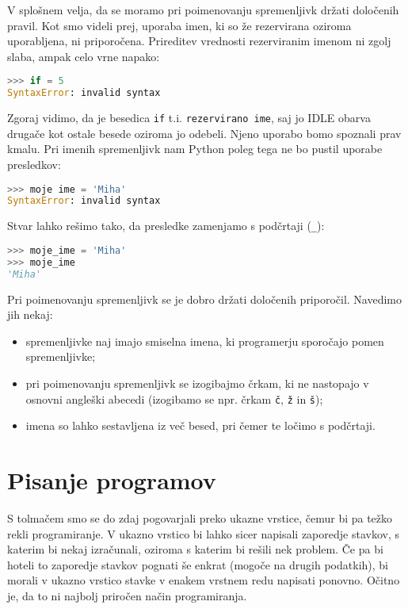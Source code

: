 V splošnem velja, da se moramo pri poimenovanju spremenljivk držati določenih pravil. Kot smo videli prej, uporaba imen, ki so že rezervirana oziroma uporabljena, ni priporočena. Prireditev vrednosti rezerviranim imenom ni zgolj slaba, ampak celo vrne napako:
\begin{lstlisting}[language=Python]
>>> if = 5
SyntaxError: invalid syntax
\end{lstlisting}
Zgoraj vidimo, da je besedica \texttt{if} t.i. \texttt{rezervirano ime}, saj jo IDLE obarva drugače kot ostale besede oziroma jo odebeli. Njeno uporabo bomo spoznali prav kmalu. Pri imenih spremenljivk nam Python poleg tega ne bo pustil uporabe presledkov:
\begin{lstlisting}[language=Python]
>>> moje ime = 'Miha'
SyntaxError: invalid syntax
\end{lstlisting}
Stvar lahko rešimo tako, da presledke zamenjamo s podčrtaji (\texttt{\_}):
\begin{lstlisting}[language=Python]
>>> moje_ime = 'Miha'
>>> moje_ime
'Miha'
\end{lstlisting}
Pri poimenovanju spremenljivk se je dobro držati določenih priporočil. Navedimo jih nekaj:
\begin{itemize}
    \item spremenljivke naj imajo smiselna imena, ki programerju sporočajo pomen spremenljivke;
    \item pri poimenovanju spremenljivk se izogibajmo črkam, ki ne nastopajo v osnovni angleški abecedi (izogibamo se npr. črkam \texttt{č}, \texttt{ž} in \texttt{š});
    \item imena so lahko sestavljena iz več besed, pri čemer te ločimo s podčrtaji.
\end{itemize}

\section{Pisanje programov}

S tolmačem smo se do zdaj pogovarjali preko ukazne vrstice, čemur bi pa težko rekli programiranje. V ukazno vrstico bi lahko sicer napisali zaporedje stavkov, s katerim bi nekaj izračunali, oziroma s katerim bi rešili nek problem. Če pa bi hoteli to zaporedje stavkov pognati še enkrat (mogoče na drugih podatkih), bi morali v ukazno vrstico stavke v enakem vrstnem redu napisati ponovno. Očitno je, da to ni najbolj priročen način programiranja.


